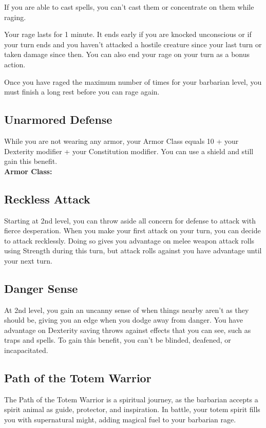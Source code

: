 \documentclass[letterpaper,openany,oneside,twocolumn]{book}
\begin{document}
If you are able to cast spells, you can't cast them or concentrate on them while raging.

Your rage lasts for 1 minute. It ends early if you are knocked unconscious or if your turn ends and you haven't attacked a hostile creature since your last turn or taken damage since then. You can also end your rage on your turn as a bonus action.

Once you have raged the maximum number of times for your barbarian level, you must finish a long rest before you can rage again.
\subsection*{Unarmored Defense}
While you are not wearing any armor, your Armor Class equals 10 + your Dexterity modifier + your Constitution modifier. You can use a shield and still gain this benefit.\\
\textbf{Armor Class: }
\subsection*{Reckless Attack}
Starting at 2nd level, you can throw aside all concern for defense to attack with fierce desperation. When you make your first attack on your turn, you can decide to attack recklessly. Doing so gives you advantage on melee weapon attack rolls using Strength during this turn, but attack rolls against you have advantage until your next turn.
\subsection*{Danger Sense}
At 2nd level, you gain an uncanny sense of when things nearby aren't as they should be, giving you an edge when you dodge away from danger. You have advantage on Dexterity saving throws against effects that you can see, such as traps and spells. To gain this benefit, you can't be blinded, deafened, or incapacitated.
\subsection*{Path of the Totem Warrior}
The Path of the Totem Warrior is a spiritual journey, as the barbarian accepts a spirit animal as guide, protector, and inspiration. In battle, your totem spirit fills you with supernatural might, adding magical fuel to your barbarian rage.
\end{document}
